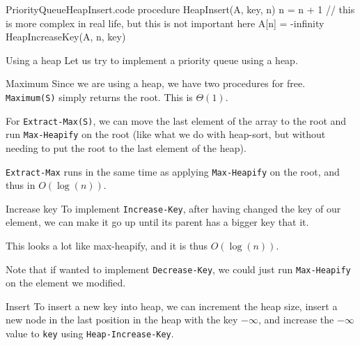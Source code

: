 \documentclass[a4paper]{article}
\begin{document}
\begin{filecontents*}[overwrite]{PriorityQueueHeapInsert.code}
procedure HeapInsert(A, key, n)
    n = n + 1  // this is more complex in real life, but this is not important here
    A[n] = -infinity
    HeapIncreaseKey(A, n, key)
\end{filecontents*}


\begin{parag}{Using a heap}
    Let us try to implement a priority queue using a heap. 

    \begin{subparag}{Maximum}
        Since we are using a heap, we have two procedures for free. \texttt{Maximum(S)} simply returns the root. This is $\Theta\left(1\right)$.

        For \texttt{Extract-Max(S)}, we can move the last element of the array to the root and run \texttt{Max-Heapify} on the root (like what we do with heap-sort, but without needing to put the root to the last element of the heap).

         \texttt{Extract-Max} runs in the same time as applying \texttt{Max-Heapify} on the root, and thus in $O\left(\log\left(n\right)\right)$.
    \end{subparag}

    \begin{subparag}{Increase key}
        To implement \texttt{Increase-Key}, after having changed the key of our element, we can make it go up until its parent has a bigger key that it.
        
        This looks a lot like max-heapify, and it is thus $O\left(\log\left(n\right)\right)$.

        Note that if wanted to implement \texttt{Decrease-Key}, we could just run \texttt{Max-Heapify} on the element we modified. 
    \end{subparag}

    \begin{subparag}{Insert}
        To insert a new key into heap, we can increment the heap size, insert a new node in the last position in the heap with the key $-\infty$, and increase the $-\infty$ value to \texttt{key} using \texttt{Heap-Increase-Key}.
        
    \end{subparag}

\end{parag}
\end{document}
